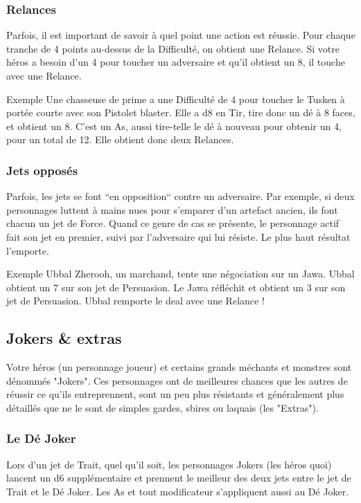 \subsubsection{Relances}
Parfois, il est important de savoir à quel point une action est réussie. Pour chaque tranche de 4 points au-dessus de la Difficulté, on obtient une Relance. Si votre héros a besoin d’un 4 pour toucher un adversaire et qu’il obtient un 8, il touche avec une Relance.

\begin{commentbox}{Exemple}
Une chasseuse de prime a une Difficulté de 4 pour toucher le Tusken à portée courte avec son Pistolet blaster. Elle a d8 en Tir, tire donc un dé à 8 faces, et obtient un 8. C’est un As, aussi tire-telle le dé à nouveau pour obtenir un 4, pour un total de 12. Elle obtient donc deux Relances.
\end{commentbox}

\subsubsection{Jets opposés}
Parfois, les jets se font “en opposition“ contre un adversaire. Par exemple, si deux personnages luttent à mains nues pour s’emparer d’un artefact ancien, ils font chacun un jet de Force. Quand ce genre de cas se présente, le personnage actif fait son jet en premier, suivi par l’adversaire qui lui résiste. Le plus haut résultat l’emporte.

\begin{commentbox}{Exemple}
Ubbal Zherooh, un marchand, tente une négociation sur un Jawa. Ubbal obtient un 7 sur son jet de Persuasion. Le Jawa réfléchit et obtient un 3 sur son jet de Persuasion. Ubbal remporte le deal avec une Relance !
\end{commentbox}


\subsection{Jokers \& extras}
Votre héros (un personnage joueur) et certains grands méchants et monstres sont dénommés "Jokers". Ces personnages ont de meilleures chances que les autres de réussir ce qu’ils entreprennent, sont un peu plus résistants et généralement plus détaillés que ne le sont de simples gardes, sbires ou laquais (les "Extras").

\subsubsection{Le Dé Joker}
Lors d’un jet de Trait, quel qu’il soit, les personnages Jokers (les héros quoi) lancent un d6 supplémentaire et prennent le meilleur des deux jets entre le jet de Trait et le Dé Joker. Les As et tout modificateur s’appliquent aussi au Dé Joker.

